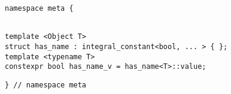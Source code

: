 
\begin{verbatim}
namespace meta {
\end{verbatim}
\begin{verbatim}

template <Object T>
struct has_name : integral_constant<bool, ... > { };
template <typename T>
constexpr bool has_name_v = has_name<T>::value;

\end{verbatim}
\begin{verbatim}
} // namespace meta
\end{verbatim}

